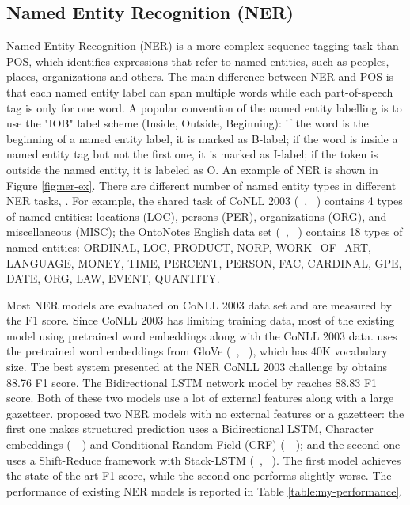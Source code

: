 \documentclass{sfuthesis}
\begin{document}



\subsection{Named Entity Recognition (NER)}

Named Entity Recognition (NER) is a more complex sequence tagging task than POS, which identifies expressions
that refer to named entities, such as peoples, places, organizations and others. The main difference between NER and POS is that each named entity label can span multiple words while each part-of-speech tag is only for one word. A popular convention of the named entity labelling is to use the "IOB" label scheme (Inside, Outside, Beginning): if the word is the beginning of a named entity label, it is marked as B-label; if the word is inside a named entity tag but not the first one, it is marked as I-label; if the token is outside the named entity, it is labeled as O. An example of NER is shown in Figure \ref{fig:ner-ex}. There are different number of named entity types in different NER tasks, . For example, the shared task of CoNLL 2003 (~\citeauthor{tjong2003introduction}, ~\citeyear{tjong2003introduction}) contains 4 types of named entities: locations (LOC), persons (PER), organizations (ORG), and miscellaneous (MISC); the OntoNotes English data set (~\citeauthor{hovy2006ontonotes}, ~\citeyear{hovy2006ontonotes}) contains 18 types of named entities: ORDINAL, LOC, PRODUCT, NORP, WORK\_OF\_ART, LANGUAGE, MONEY, TIME, PERCENT, PERSON, FAC, CARDINAL, GPE, DATE, ORG, LAW, EVENT, QUANTITY.

Most NER models are evaluated on CoNLL 2003 data set and are measured by the F1 score. Since CoNLL 2003 has limiting training data, most of the existing model using pretrained word embeddings along with the CoNLL 2003 data. \cite{lample2016neural} uses the pretrained word embeddings from GloVe (~\citeauthor{pennington2014glove}, ~\citeyear{pennington2014glove}), which has 40K vocabulary size. The best system presented at the NER CoNLL 2003 challenge by \cite{florian2003named} obtains 88.76 F1 score. The Bidirectional LSTM network model by \cite{huang2015bidirectional} reaches 88.83 F1 score. Both of these two models use a lot of external features along with a large gazetteer. \cite{lample2016neural} proposed two NER models with no external features or a gazetteer: the first one makes structured prediction uses a Bidirectional LSTM, Character embeddings (~\citeauthor{ling2015finding}~\citeyear{ling2015finding}) and Conditional Random Field (CRF) (~\citeauthor{lafferty2001conditional}~\citeyear{lafferty2001conditional}); and the second one uses a Shift-Reduce framework with Stack-LSTM (~\citeauthor{dyer2015transition}, ~\citeyear{dyer2015transition}). The first model achieves the state-of-the-art F1 score, while the second one performs slightly worse. The performance of existing NER models is reported in Table \ref{table:my-performance}.
\end{document}
